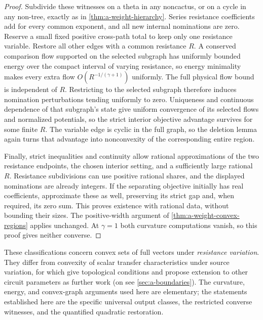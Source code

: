 \begin{proof}
Subdivide these witnesses on a theta in any noncactus, or on a cycle in
any non-tree, exactly as in \cref{thm:a-weight-hierarchy}. Series
resistance coefficients add for every common exponent, and all new
internal nominations are zero. Reserve a small fixed positive cross-path
total to keep only one resistance variable. Restore all other edges with
a common resistance $R$. A conserved comparison flow supported on the
selected subgraph has uniformly bounded energy over the compact interval
of varying resistance, so energy minimality makes every extra flow
$O(R^{-1/(\gamma+1)})$ uniformly. The full physical flow bound is
independent of $R$. Restricting to the selected subgraph therefore
induces nomination perturbations tending uniformly to zero. Uniqueness
and continuous dependence of that subgraph's state give uniform
convergence of its selected flows and normalized potentials, so the
strict interior objective advantage survives for some finite $R$. The
variable edge is cyclic in the full graph, so the deletion lemma again
turns that advantage into nonconvexity of the corresponding entire region.

Finally, strict inequalities and continuity allow rational approximations
of the two resistance endpoints, the chosen interior setting, and a
sufficiently large rational $R$. Resistance subdivisions can use positive
rational shares, and the displayed nominations are already integers. If
the separating objective initially has real coefficients, approximate
these as well, preserving its strict gap and, when required, its zero
sum. This proves existence with rational data, without bounding their
sizes. The positive-width argument of \cref{thm:a-weight-convex-regions}
applies unchanged. At $\gamma=1$ both curvature computations vanish, so
this proof gives neither converse.
\end{proof}

These classifications concern convex sets of full vectors under
\emph{resistance variation}. They differ from convexity of scalar
transfer characteristics under source variation, for which
\citet[Theorem 4, p.~13, and conclusion, p.~21]{wanghasler1997-convexity}
give topological conditions and propose extension to other circuit
parameters as further work (on \citet{hasler1993-parameter-tolerances}
see \cref{sec:a-boundaries}). The curvature, energy,
and convex-graph arguments used here are elementary; the statements
established here are the specific universal output classes, the
restricted converse witnesses, and the quantified quadratic restoration.

